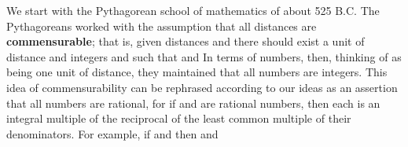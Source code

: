 \documentclass[11pt,oneside]{article}
\begin{document}
\begin{BookBody}
We start with the Pythagorean school of mathematics of about 525 B.C. The Pythagoreans worked with the assumption that all distances are\textbf{ commensurable}; that is, given distances  and  there should exist a unit of distance  and integers  and  such that  and  In terms of numbers, then, thinking of  as being 
one unit of distance, they maintained that all numbers are integers. This idea of commensurability can be rephrased according to our ideas as an assertion that all numbers are rational, for if  and  are rational numbers, then each is an integral multiple of the reciprocal of the least common multiple of their denominators. For example, if  and  then  and 

\end{BookBody}

\BookNarrativetrue
\end{document}
